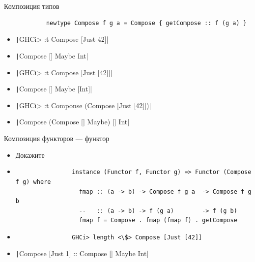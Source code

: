     \begin{frame}[fragile]{Композиция типов}
        \vspace{-0.5em}
        \pause
        \begin{verbatim}
            newtype Compose f g a = Compose { getCompose :: f (g a) }
        \end{verbatim}
        \begin{itemize}
            \item[\todo] \pause \texttt|GHCi> :t Compose [Just 42]|
            \item[\answer] \pause \texttt|Compose [] Maybe Int|
            \item[\todo] \pause \texttt|GHCi> :t Compose [Just [42]]|
            \item[\answer] \pause \texttt|Compose [] Maybe [Int]|
            \item[\todo] \pause \texttt|GHCi> :t Componse (Compose [Just [42]])|
            \item[\answer] \pause \texttt|Compose (Compose [] Maybe) [] Int|
        \end{itemize}
    \end{frame}

    \begin{frame}[fragile]{Композиция функторов --- функтор}
        \begin{itemize}
            \item[\todo] Докажите
            \item[\answer] \pause
            \begin{verbatim}
                instance (Functor f, Functor g) => Functor (Compose f g) where
                  fmap :: (a -> b) -> Compose f g a  -> Compose f g b
                  --   :: (a -> b) -> f (g a)        -> f (g b)
                  fmap f = Compose . fmap (fmap f) . getCompose
            \end{verbatim}
            \item[\todo] \pause
            \begin{verbatim}
                GHCi> length <\$> Compose [Just [42]]
            \end{verbatim}
            \item[\answer] \pause \texttt|Compose [Just 1] :: Compose [] Maybe Int|
        \end{itemize}
    \end{frame}

